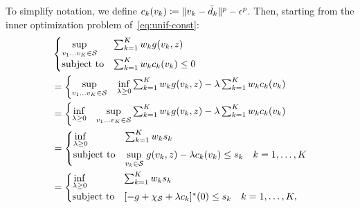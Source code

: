To simplify notation, we define $c_k(v_k) \coloneqq   \| v_k - \bar{d}_k \|^p - \epsilon^p$. Then, starting from the inner optimization problem of~\eqref{eq:unif-const}:
\begin{equation*}
	\begin{aligned}
& \begin{cases}
	\underset{v_1 \dots v_K \in \mathcal{S}}{\sup} &\sum_{k=1} ^K w_k g(v_k, z) \\
	\mbox{subject to} & \sum_{k=1} ^K w_k c_k(v_k) \le 0
\end{cases}\\
&= \begin{cases}
	\underset{v_1 \dots v_K\in \mathcal{S}}{\sup}  & \underset{\lambda \geq 0}{\inf}   \sum_{k=1} ^K  w_k g(v_k, z)  - \lambda \sum_{k=1} ^K w_k c_k (v_k)\\
	\end{cases}\\
	&= \begin{cases}
		\underset{\lambda \geq 0}{\inf} & \underset{v_1 \dots v_K\in \mathcal{S}}{\sup}    \sum_{k=1} ^K  w_k  g(v_k, z)  - \lambda \sum_{k=1} ^K w_k c_k (v_k)\\
		\end{cases}\\
&= \begin{cases}
	\underset{\lambda \geq 0}{\inf} &  \sum_{k=1} ^K  w_k s_k \\
	\mbox{subject to} &  \underset{v_k\in \mathcal{S}}{\sup}\hspace{1mm} g(v_k, z) -\lambda c_k (v_k)  \le s_k \quad k = 1,\dots,K
\end{cases}\\
&= \begin{cases}
	\underset{\lambda \geq 0}{\inf} &  \sum_{k=1} ^K  w_k s_k \\
	\mbox{subject to} &  [-g +\chi_{\mathcal{S}} + \lambda c_k]^*(0)  \le s_k \quad k = 1,\dots,K,
\end{cases}\\
\end{aligned}
\end{equation*}

